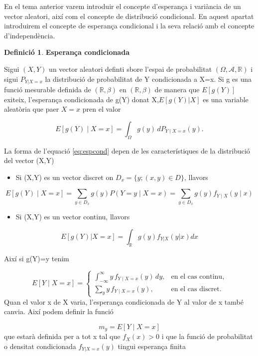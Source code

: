 \documentclass[
  catalan,
]{article}
\providecommand{\tightlist}{%
  \setlength{\itemsep}{0pt}\setlength{\parskip}{0pt}}
\theoremstyle{definition}
\newtheorem{definition}{Definició}[section]
\theoremstyle{definition}
\theoremstyle{definition}
\theoremstyle{definition}
\theoremstyle{remark}
\begin{document}
En el tema anterior varem introduir el concepte d'esperança i variància de un vector aleatori, així com el concepte de distribució condicional. En aquest apartat introduirem el concepte de esperança condicional i la seva relació amb el concepte d'independència.

\begin{definition}
\textbf{Esperança condicionada}

Sigui \((X,Y)\) un vector aleatori definti sbore l'espai de probabilitat \((\Omega,\mathcal{A}, \mathbb{R})\) i sigui \(P_{Y|X=x}\) la distribució de probabilitat de Y condicionada a X=x. Si g es una funció mesurable definida de \((\mathbb{R},\beta)\) en \((\mathbb{R},\beta)\) de manera que \(E[g(Y)]\) exiteix, l'esperança condicionada de g(Y) donat X,\(E[g(Y)|X]\) es una variable aleatòria que paer \(X=x\) pren el valor

\[
E\!\left[g(Y)\mid X=x\right]
=
\int_{\Omega} g(y)\, dP_{Y\mid X=x}(y).  \label{eq:espcond}
\]
\end{definition}

La forma de l'equació \eqref{eq:espcond} depen de les característiques de la distribució del vector (X,Y)

\begin{itemize}
\tightlist
\item
  Si (X,Y) es un vector discret on \(D_x=\{y;(x,y) \in D\}\), llavors
\end{itemize}

\[
E[g(Y)\mid X=x]=\sum_{y\in D_x} g(y)P(Y=y\mid X=x)=\sum_{y\in D_x}g(y)f_{Y\mid X}(y\mid x)
\]

\begin{itemize}
\tightlist
\item
  Si (X,Y) es un vector continu, llavors
\end{itemize}

\[
E[g(Y)| X=x] =\int_{\mathbb{R}} g(y)f_{Y | X}(y |x) dx
\]

Així si g(Y)=y tenim

\[
E[Y\mid X=x]=
\begin{cases}
\displaystyle
\int_{-\infty}^{\infty}
y\,f_{Y\mid X=x}(y)\,dy,
& \text{en el cas continu},\\
\displaystyle
\sum_{y}
y\,f_{Y\mid X=x}(y),
& \text{en el cas discret}.
\end{cases}
\label{eq:espcondic}
\]
Quan el valor x de X varia, l'esperança condicionada de Y al valor de x també canvia. Així podem definir la funció

\[
m_y =E[Y \mid X=x]
\]
que estarà definida per a tot x tal que \(f_X(x)>0\) i que la funció de probabilitat o densitat condicionada \(f_{Y|X=x}(y)\) tingui esperança finita
\end{document}
